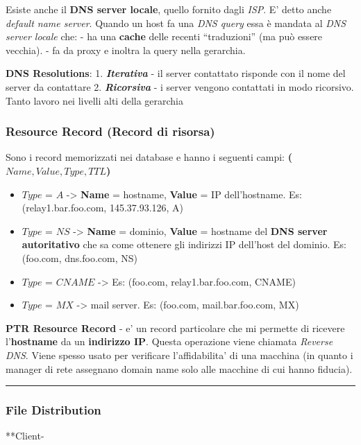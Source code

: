 Esiste anche il \textbf{DNS server locale}, quello fornito dagli
\emph{ISP}. E' detto anche \emph{default name server}. Quando un host fa
una \emph{DNS query} essa è mandata al \emph{DNS server locale} che: -
ha una \textbf{cache} delle recenti ``traduzioni'' (ma può essere
vecchia). - fa da proxy e inoltra la query nella gerarchia.

\textbf{DNS Resolutions}: 1. \textbf{\emph{Iterativa}} - il server
contattato risponde con il nome del server da contattare 2.
\textbf{\emph{Ricorsiva}} - i server vengono contattati in modo
ricorsivo. Tanto lavoro nei livelli alti della gerarchia

\hypertarget{resource-record-record-di-risorsa}{%
\subsubsection{Resource Record (Record di
risorsa)}\label{resource-record-record-di-risorsa}}

Sono i record memorizzati nei database e hanno i seguenti campi:
\textbf{(\(Name, Value, Type, TTL\))}

\begin{itemize}
\tightlist
\item
  \(Type\) = \(A\) -\textgreater{} \textbf{Name} = hostname,
  \textbf{Value} = IP dell'hostname. Es: (relay1.bar.foo.com,
  145.37.93.126, A)
\item
  \(Type\) = \(NS\) -\textgreater{} \textbf{Name} = dominio,
  \textbf{Value} = hostname del \textbf{DNS server autoritativo} che sa
  come ottenere gli indirizzi IP dell'host del dominio. Es: (foo.com,
  dns.foo.com, NS)
\item
  \(Type\) = \(CNAME\) -\textgreater{} Es: (foo.com, relay1.bar.foo.com,
  CNAME)
\item
  \(Type\) = \(MX\) -\textgreater{} mail server. Es: (foo.com,
  mail.bar.foo.com, MX)
\end{itemize}

\textbf{PTR Resource Record} - e' un record particolare che mi permette
di ricevere l'\textbf{hostname} da un \textbf{indirizzo IP}. Questa
operazione viene chiamata \emph{Reverse DNS}. Viene spesso usato per
verificare l'affidabilita' di una macchina (in quanto i manager di rete
assegnano domain name solo alle macchine di cui hanno fiducia).

\begin{center}\rule{0.5\linewidth}{\linethickness}\end{center}

\hypertarget{file-distribution}{%
\subsubsection{File Distribution}\label{file-distribution}}

**Client-